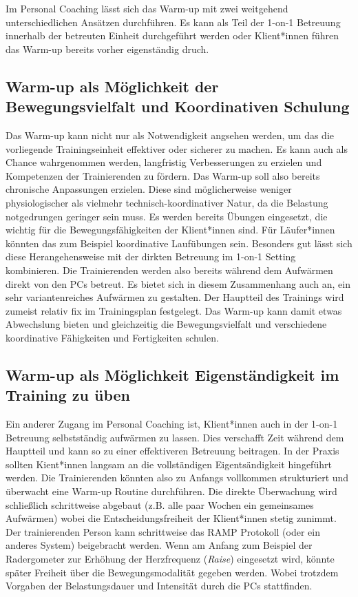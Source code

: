 \documentclass[
  letterpaper,
  DIV=11,
  numbers=noendperiod]{scrreprt}
\begin{document}
Im Personal Coaching lässt sich das Warm-up mit zwei weitgehend
unterschiedlichen Ansätzen durchführen. Es kann als Teil der 1-on-1
Betreuung innerhalb der betreuten Einheit durchgeführt werden oder
Klient*innen führen das Warm-up bereits vorher eigenständig druch.

\subsection{Warm-up als Möglichkeit der Bewegungsvielfalt und
Koordinativen
Schulung}\label{warm-up-als-muxf6glichkeit-der-bewegungsvielfalt-und-koordinativen-schulung}

Das Warm-up kann nicht nur als Notwendigkeit angsehen werden, um das die
vorliegende Trainingseinheit effektiver oder sicherer zu machen. Es kann
auch als Chance wahrgenommen werden, langfristig Verbesserungen zu
erzielen und Kompetenzen der Trainierenden zu fördern. Das Warm-up soll
also bereits chronische Anpassungen erzielen. Diese sind möglicherweise
weniger physiologischer als vielmehr technisch-koordinativer Natur, da
die Belastung notgedrungen geringer sein muss. Es werden bereits Übungen
eingesetzt, die wichtig für die Bewegungsfähigkeiten der Klient*innen
sind. Für Läufer*innen könnten das zum Beispiel koordinative Laufübungen
sein. Besonders gut lässt sich diese Herangehensweise mit der dirkten
Betreuung im 1-on-1 Setting kombinieren. Die Trainierenden werden also
bereits während dem Aufwärmen direkt von den PCs betreut. Es bietet sich
in diesem Zusammenhang auch an, ein sehr variantenreiches Aufwärmen zu
gestalten. Der Hauptteil des Trainings wird zumeist relativ fix im
Trainingsplan festgelegt. Das Warm-up kann damit etwas Abwechslung
bieten und gleichzeitig die Bewegungsvielfalt und verschiedene
koordinative Fähigkeiten und Fertigkeiten schulen.

\subsection{Warm-up als Möglichkeit Eigenständigkeit im Training zu
üben}\label{warm-up-als-muxf6glichkeit-eigenstuxe4ndigkeit-im-training-zu-uxfcben}

Ein anderer Zugang im Personal Coaching ist, Klient*innen auch in der
1-on-1 Betreuung selbstständig aufwärmen zu lassen. Dies verschafft Zeit
während dem Hauptteil und kann so zu einer effektiveren Betreuung
beitragen. In der Praxis sollten Kient*innen langsam an die
vollständigen Eigentsändigkeit hingeführt werden. Die Trainierenden
könnten also zu Anfangs vollkommen strukturiert und überwacht eine
Warm-up Routine durchführen. Die direkte Überwachung wird schließlich
schrittweise abgebaut (z.B. alle paar Wochen ein gemeinsames Aufwärmen)
wobei die Entscheidungsfreiheit der Klient*innen stetig zunimmt. Der
trainierenden Person kann schrittweise das RAMP Protokoll (oder ein
anderes System) beigebracht werden. Wenn am Anfang zum Beispiel der
Radergometer zur Erhöhung der Herzfrequenz (\emph{Raise}) eingesetzt
wird, könnte später Freiheit über die Bewegungsmodalität gegeben werden.
Wobei trotzdem Vorgaben der Belastungsdauer und Intensität durch die PCs
stattfinden.
\end{document}
